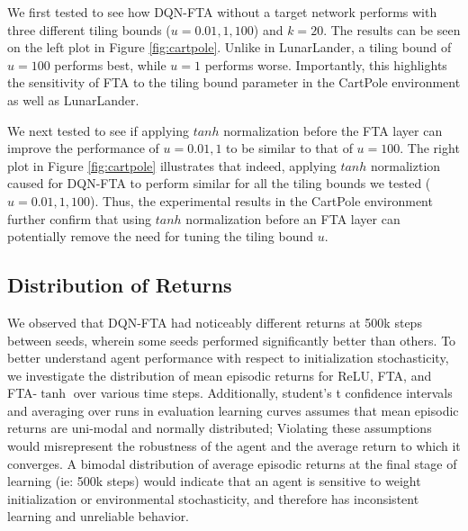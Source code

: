 \documentclass{article}
\begin{document}
We first tested to see how DQN-FTA without a target network performs with three different tiling bounds ($u=0.01, 1, 100$) and $k=20$.
The results can be seen on the left plot in Figure \ref{fig:cartpole}.
Unlike in LunarLander, a tiling bound of $u=100$ performs best, while $u=1$ performs worse.
Importantly, this highlights the sensitivity of FTA to the tiling bound parameter in the CartPole environment as well as LunarLander.

We next tested to see if applying $tanh$ normalization before the FTA layer can improve the performance of $u=0.01, 1$ to be similar to that of $u=100$.
The right plot in Figure \ref{fig:cartpole} illustrates that indeed, applying $tanh$ normaliztion caused for DQN-FTA to perform similar for all the tiling bounds we tested ($u=0.01, 1, 100$).
Thus, the experimental results in the CartPole environment further confirm that using $tanh$ normalization before an FTA layer can potentially remove the need for tuning the tiling bound $u$.


\subsection{Distribution of Returns} \label{sub-sec:distribution}
We observed that DQN-FTA had noticeably different returns at 500k steps between seeds, wherein some seeds performed significantly better than others. 
To better understand agent performance with respect to initialization stochasticity, we investigate the distribution of mean episodic returns for ReLU, FTA, and FTA-$\tanh$ over various time steps. 
Additionally, student's t confidence intervals and averaging over runs in evaluation learning curves assumes that mean episodic returns are uni-modal and normally distributed; 
Violating these assumptions would misrepresent the robustness of the agent and the average return to which it converges. 
A bimodal distribution of average episodic returns at the final stage of learning (ie: 500k steps) would indicate that an agent is sensitive to weight initialization or environmental stochasticity, and therefore has inconsistent learning and unreliable behavior. 
\end{document}
